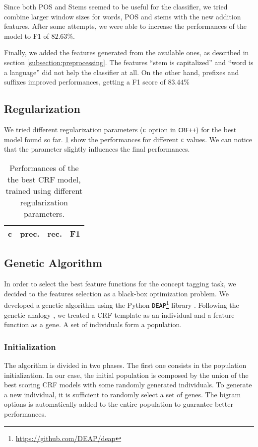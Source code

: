 Since both POS and Stems seemed to be useful for the classifier, we tried combine larger window sizes for words, \ac{POS} and stems with the new addition features.
After some attempts, we were able to increase the performances of the model to F1 of $82.63\%$.

Finally, we added the features generated from the available ones, as described in section \cref{subsection:preprocessing}.
The features ``stem is capitalized'' and ``word is a language'' did not help the classifier at all.
On the other hand, prefixes and suffixes improved performances, getting a F1 score of $83.44\%$

\subsection{Regularization}
We tried different regularization parameters (\texttt{c} option in \texttt{CRF++}) for the best model found so far.
\cref{tab:regularization} show the performances for different \texttt{c} values.
We can notice that the parameter slightly influences the final performances.

\begin{table}[h]
	\centering
    \begin{tabular}{ c c c c }
    	\toprule
    		\multicolumn{1}{c}{c} & \multicolumn{1}{c}{prec.} & \multicolumn{1}{c}{rec.} & \multicolumn{1}{c}{F1} \\
    	\midrule
            
    	\bottomrule
	\end{tabular}
    \caption{Performances of the the best \ac{CRF} model, trained using different regularization parameters.}
	\label{tab:regularization}
\end{table}

\subsection{Genetic Algorithm}
\label{subsection:genetic}
In order to select the best feature functions for the concept tagging task, we decided to the features selection as a black-box optimization problem.
We developed a genetic algorithm using the Python \texttt{DEAP}\footnote{\url{https://github.com/DEAP/deap}} library \cite{deap}.
Following the genetic analogy \cite{lion}, we treated a \ac{CRF} template as an individual and a feature function as a gene.
A set of individuals form a population.

\subsubsection{Initialization}
The algorithm is divided in two phases.
The first one consists in the population initialization.
In our case, the initial population is composed by the union of the best scoring \ac{CRF} models with some randomly generated individuals.
To generate a new individual, it is sufficient to randomly select a set of genes.
The bigram options is automatically added to the entire population to guarantee better performances.


